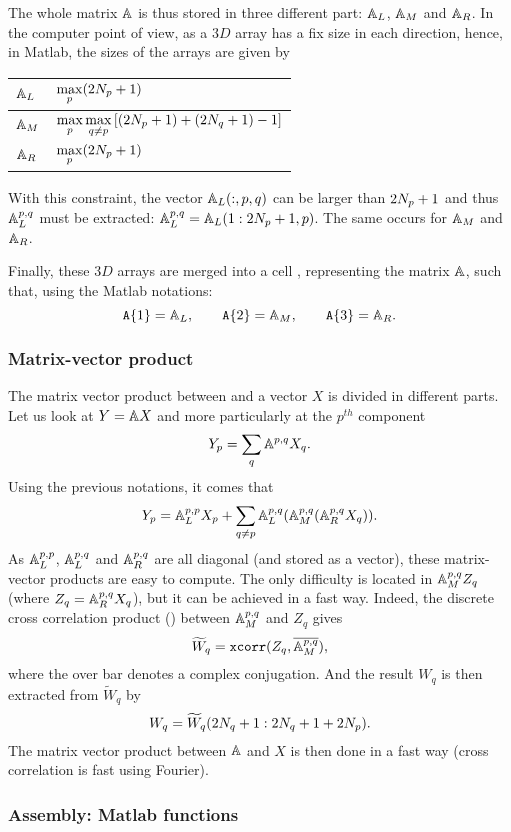The whole matrix ${\mathbb{A}}$ is thus stored in three different part: ${\mathbb{A}}_L$, ${\mathbb{A}}_M$ and ${\mathbb{A}}_R$. In the computer point of view, as a $3D$ array has a fix size in each direction, hence, in Matlab, the sizes of the arrays are given by
\begin{center}
\begin{tabular}{| l | l |}
\hline${\mathbb{A}}_L$ & $\displaystyle \max_p(2N_{p}+1)$\\[0.2cm]\hline
${\mathbb{A}}_M$ & $\displaystyle \max_{p}\max_{q\neq p}\left[(2N_{p}+1)+(2N_{q}+1)-1\right]$\\[0.2cm]\hline
${\mathbb{A}}_R$ & $\displaystyle \max_p(2N_{p}+1)$\\[0.2cm]\hline
\end{tabular}\end{center}
With this constraint, the vector ${\mathbb{A}}_L(:,p,q)$ can be larger than $2N_{p}+1$ and thus ${\mathbb{A}}_L^{p,q}$ must be extracted: ${\mathbb{A}}_L^{p,q} = {\mathbb{A}}_L(1:2N_{p}+1,p)$. The same occurs for ${\mathbb{A}}_M$ and ${\mathbb{A}}_R$. 

Finally, these $3D$ arrays are merged into a cell , representing the matrix ${\mathbb{A}}$, such that, using the Matlab notations:
$$
\texttt{A}\{1\} = {\mathbb{A}}_L,\qquad \texttt{A}\{2\} = {\mathbb{A}}_M,\qquad\texttt{A}\{3\} = {\mathbb{A}}_R.
$$

\subsubsection{Matrix-vector product}

The matrix vector product between  and a vector $X$ is divided in different parts. Let us look at $Y={\mathbb{A}} X$ and more particularly at the $p^{th}$ component
$$
Y_p = \sum_{q} \mathbb{A}^{p,q} X_q.
$$
Using the previous notations, it comes that
$$
Y_p = {\mathbb{A}}_L^{p,p} X_p + \sum_{q\neq p} {\mathbb{A}}_L^{p,q} ({\mathbb{A}}_M^{p,q} ({\mathbb{A}}_R^{p,q} X_q)).
$$
As ${\mathbb{A}}_L^{p,p}$, ${\mathbb{A}}_L^{p,q}$ and ${\mathbb{A}}_R^{p,q}$ are all diagonal (and stored as a vector), these matrix-vector products are easy to compute. The only difficulty is located in ${\mathbb{A}}_M^{p,q} Z_q$ (where $Z_q={\mathbb{A}}_R^{p,q} X_q$), but it can be achieved in a fast way. Indeed, the discrete cross correlation product () between ${\mathbb{A}}_M^{p,q}$ and $Z_q$ gives
$$
\widetilde{W}_q = \texttt{xcorr}(Z_q, \overline{{\mathbb{A}}_M^{p,q}}),
$$
where the over bar denotes a complex conjugation. And the result $W_q$ is then extracted from $\widetilde{W}_q$ by
$$
W_q = \widetilde{W}_q(2N_{q}+1:2N_{q}+1+2N_{p}).
$$
The matrix vector product between ${\mathbb{A}}$ and $X$ is then done in a fast way (cross correlation is fast using Fourier).


\subsubsection{Assembly: Matlab functions}


